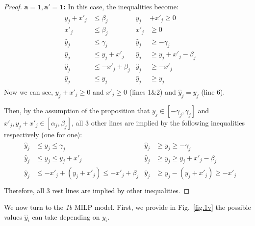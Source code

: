\begin{proof}[Proof]
	
\textbf{$\mathbf{a = 1, a' = 1}$:} In this case, the inequalities become: \begin{align*}
	& \begin{aligned}
		y_j + x'_j &\leq \beta_j        &
		y_j &+ x'_j \geq 0 \\
		x'_j       &\leq \beta_j       & 
		x'_j       &\geq 0 \\
		\hat{y}_j  &\leq \gamma_j       &
		\hat{y}_j  &\geq -\gamma_j \\
		\hat{y}_j  &\leq y_j + x'_j  &
		\hat{y}_j  &\geq y_j + x'_j - \beta_j \\
		\hat{y}_j  &\leq -x'_j + \beta_j &
		\hat{y}_j  &\geq -x'_j \\
		\hat{y}_j  &\leq y_j &
		\hat{y}_j  &\geq y_j
	\end{aligned}
\end{align*} Now we can see, $y_j+x'_j\geq 0$ and $x'_j \geq 0$ (lines 1\&2) and $\hat{y}_j= y_j$ (line 6). 


Then, by the assumption of the proposition that $y_j \in [-\gamma_j, \gamma_j]$ and $x'_j,y_j+x'_j \in [\alpha_j,\beta_j]$, all 3 other lines are implied by the following inequalities respectively (one for one):\begin{align*}
	& \begin{aligned}
		\hat{y}_j  &\leq y_j\leq \gamma_j       &
		\hat{y}_j  &\geq y_j\geq -\gamma_j \\
		\hat{y}_j  &\leq y_j \leq y_j + x'_j  &
		\hat{y}_j  &\geq y_j \geq y_j + x'_j - \beta_j \\
		\hat{y}_j  &\leq -x'_j+(y_j+x'_j)\leq -x'_j + \beta_j &
		\hat{y}_j  &\geq y_j - (y_j+x'_j)\geq -x'_j \\
	\end{aligned}
\end{align*}Therefore, all 3 rest lines are implied by other inequalities.
	
\end{proof}


We now turn to the {\em 1b} MILP model. 
First, we provide in Fig.~\ref{fig.1v} the possible values $\hat{y}_i$ can take depending on $y_i$. 



